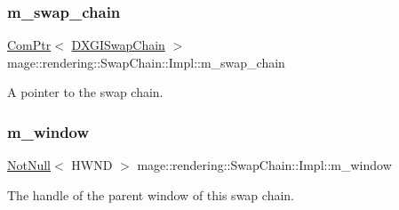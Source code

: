 \subsubsection{\texorpdfstring{m\+\_\+swap\+\_\+chain}{m\_swap\_chain}}
{\footnotesize\ttfamily \hyperlink{namespacemage_ae74f374780900893caa5555d1031fd79}{Com\+Ptr}$<$ \hyperlink{namespacemage_1_1rendering_a739d2b0d24b44bcfb16903df756fedf6}{D\+X\+G\+I\+Swap\+Chain} $>$ mage\+::rendering\+::\+Swap\+Chain\+::\+Impl\+::m\+\_\+swap\+\_\+chain\hspace{0.3cm}{\ttfamily [private]}}

A pointer to the swap chain. \hypertarget{classmage_1_1rendering_1_1_swap_chain_1_1_impl_a56b2c79926ed4c86de9b0cd45e0cdabd}{}\label{classmage_1_1rendering_1_1_swap_chain_1_1_impl_a56b2c79926ed4c86de9b0cd45e0cdabd} 
\subsubsection{\texorpdfstring{m\+\_\+window}{m\_window}}
{\footnotesize\ttfamily \hyperlink{namespacemage_a8769f9d670d6b585ea306cb1062af94b}{Not\+Null}$<$ H\+W\+ND $>$ mage\+::rendering\+::\+Swap\+Chain\+::\+Impl\+::m\+\_\+window\hspace{0.3cm}{\ttfamily [private]}}

The handle of the parent window of this swap chain. 